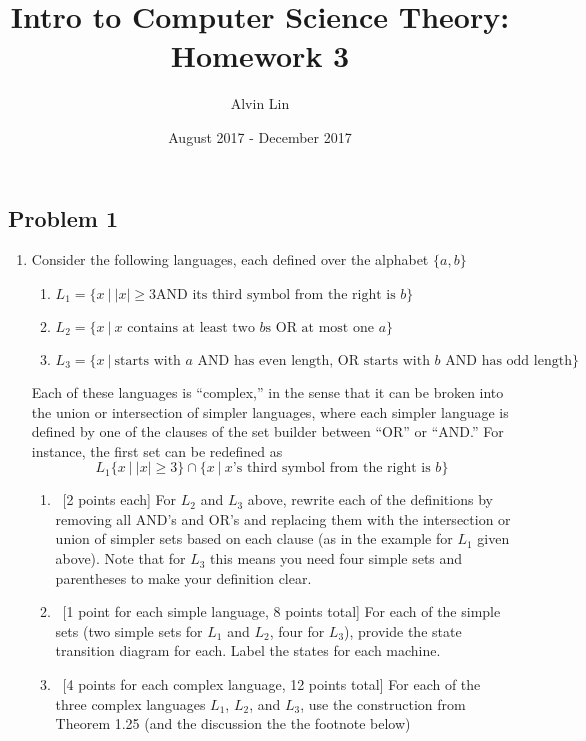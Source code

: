 \documentclass[letterpaper, 12pt]{math}
\title{Intro to Computer Science Theory: Homework 3}
\author{Alvin Lin}
\date{August 2017 - December 2017}
\begin{document}
\maketitle

\subsection*{Problem 1}

\begin{enumerate}
  \item Consider the following languages, each defined over the alphabet
  \( \{a,b\} \)
  \begin{enumerate}
    \item \( L_1 = \{x~|~|x| \geq 3 \text{AND its third symbol from the right
    is } b\} \)
    \item \( L_2 = \{x~|~x \text{ contains at least two } b\text{s OR at most
    one } a\} \)
    \item \( L_3=\{x ~|~\mbox{starts with }a\mbox{ AND has even length, OR
    starts with } b \mbox{ AND has odd length}\} \)
  \end{enumerate}
  Each of these languages is ``complex,'' in the sense that it can be broken
  into the union or intersection of simpler languages, where each simpler
  language is defined by one of the clauses of the set builder between ``OR''
  or ``AND.'' For instance, the first set can be redefined as
  \[ L_1 \{x~|~|x| \geq 3\} \cap \{x~|~x\mbox{'s third symbol from the right is
    } b\} \]
  \begin{enumerate}
    \item ~[2 points each] For \( L_2 \) and \( L_3 \) above, rewrite each of
    the definitions by removing all AND's and OR's and replacing them with the
    intersection or union of simpler sets based on each clause (as in the
    example for \( L_1 \) given above). Note that for \( L_3 \) this means you
    need four simple sets and parentheses to make your definition clear.
    \item ~[1 point for each simple language, 8 points total] For each of the
    simple sets (two simple sets for \( L_1 \) and \( L_2 \), four for
    \( L_3 \)), provide the state transition diagram for each. Label the states
    for each machine.
    \item~[4 points for each complex language, 12 points total] For each of the
    three complex languages \( L_1 \), \( L_2 \), and \( L_3 \), use the
    construction from Theorem 1.25 (and the discussion the the footnote below)

\end{enumerate}
\end{enumerate}
\end{document}
